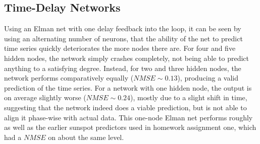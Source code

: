 \documentclass[a4paper,12pt]{article}
\theoremstyle{plain}
\theoremstyle{definition}
\begin{document}
   \subsection{Time-Delay Networks}
      Using an Elman net with one delay feedback into the loop, it can be seen
      by using an alternating number of neurons, that the ability of the net to
      predict time series quickly deteriorates the more nodes there are. For
      four and five hidden nodes, the network simply crashes completely, not being able to
      predict anything to a satisfying degree. Instead, for two and three hidden
      nodes, the network performs comparatively equally ($NMSE \sim 0.13$), producing a valid
      prediction of the time series. For a network with one hidden node, the
      output is on average slightly worse ($NMSE \sim 0.24$), mostly due to a slight shift in time, suggesting
      that the network indeed does a viable prediction, but is not able to align it
      phase-wise with actual data. This one-node Elman net performs roughly as
      well as the earlier sunspot predictors used in homework assignment one,
      which had a $NMSE$ on about the same level.
      
\end{document}
